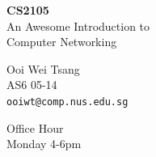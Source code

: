 \begin{frame}
\begin{center}
\textbf{
\Huge
CS2105\\[10pt]
	}
\large
An Awesome Introduction to\\ Computer Networking
\end{center}
\end{frame}


\begin{frame}
\begin{center}
\large
Ooi Wei Tsang\\
AS6 05-14\\
\large
\texttt{ooiwt@comp.nus.edu.sg}\\
\end{center}
\end{frame}

\begin{frame}
\begin{center}
\large
Office Hour\\
\large
Monday 4-6pm
\end{center}
\end{frame}


